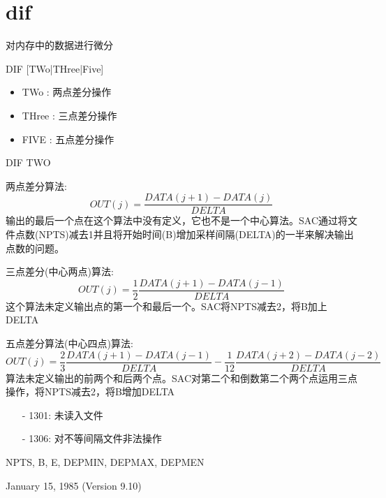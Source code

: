 \section{dif}
\label{cmd:dif}

对内存中的数据进行微分

DIF [TWo|THree|Five]

\begin{itemize}
\item TWo : 两点差分操作
\item THree : 三点差分操作
\item FIVE : 五点差分操作
\end{itemize}

DIF TWO

两点差分算法:
\[ OUT(j) =\frac{DATA(j+1) -DATA(j)}{DELTA} \]
输出的最后一个点在这个算法中没有定义，它也不是一个中心算法。SAC通过将文件点数(NPTS)减去1并且将开始时间(B)增加采样间隔(DELTA)的一半来解决输出点数的问题。 

三点差分(中心两点)算法:
\[ OUT(j) = \frac{1}{2} \frac{DATA(j+1) -DATA(j-1)}{DELTA} \]
这个算法未定义输出点的第一个和最后一个。SAC将NPTS减去2，将B加上DELTA

五点差分算法(中心四点)算法:
\[ OUT(j) = \frac{2}{3} \frac{DATA(j+1) -DATA(j-1)}{DELTA} - \frac{1}{12} \frac{DATA(j+2) -DATA(j-2)}{DELTA} \]
算法未定义输出的前两个和后两个点。SAC对第二个和倒数第二个两个点运用三点操作，将NPTS减去2，将B增加DELTA

\begin{itemize}
\item[-]1301: 未读入文件
\item[-]1306: 对不等间隔文件非法操作
\end{itemize}

NPTS, B, E, DEPMIN, DEPMAX, DEPMEN

January 15, 1985 (Version 9.10)
